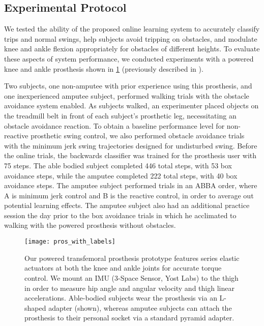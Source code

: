 \subsection{Experimental Protocol}

We tested the ability of the proposed online learning system to accurately
classify trips and normal swings, help subjects avoid tripping on obstacles, and
modulate knee and ankle flexion appropriately for obstacles of different
heights. To evaluate these aspects of system performance, we conducted
experiments with a powered knee and ankle prosthesis shown in
\cref{fig:prosthesis} (previously described in \citet{thatte2018method}).

Two subjects, one non-amputee with prior experience using this prosthesis, and
one inexperienced amputee subject, performed walking trials with the obstacle
avoidance system enabled.  As subjects walked, an experimenter placed objects on
the treadmill belt in front of each subject's prosthetic leg, necessitating an
obstacle avoidance reaction. To obtain a baseline performance level for
non-reactive prosthetic swing control, we also performed obstacle avoidance
trials with the minimum jerk swing trajectories designed for undisturbed swing.
Before the online trials, the backwards classifier was trained for the
prosthesis user with 75 steps. The able bodied subject completed 446 total
steps, with 53 box avoidance steps, while the amputee completed 222 total steps,
with 40 box avoidance steps. The amputee subject performed trials in an ABBA
order, where A is minimum jerk control and B is the reactive control, in order
to average out potential learning effects. The amputee subject also had an
additional practice session the day prior to the box avoidance trials in which
he acclimated to walking with the powered prosthesis without obstacles.

\begin{figure}[tb]
\centerline{\texttt{[image: pros\_with\_labels]}}
\caption{Our powered transfemoral prosthesis prototype features series elastic
actuators at both the knee and ankle joints for accurate torque control. We
mount an IMU (3-Space Sensor, Yost Labs) to the thigh in order to measure hip
angle and angular velocity and thigh linear accelerations. Able-bodied subjects
wear the prosthesis via an L-shaped adapter (shown), whereas amputee subjects
can attach the prosthesis to their personal socket via a standard pyramid
adapter.}\label{fig:prosthesis}
\end{figure}
